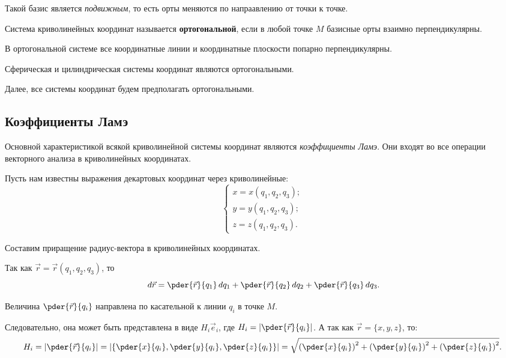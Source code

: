 	Такой базис является \textit{подвижным}, то есть орты меняются по напраавлению от точки к точке.
	
	\begin{definition}
	Система криволинейных координат называется \textbf{ортогональной}, если в любой точке \( M \) базисные орты взаимно перпендикулярны.
	\end{definition}
	
	В ортогональной системе все координатные линии и координатные плоскости попарно перпендикулярны.
	
	Сферическая и цилиндрическая системы координат являются ортогональными.
	
	Далее, все системы координат будем предполагать ортогональными.

\subsection{Коэффициенты Ламэ}

	Основной характеристикой всякой криволинейной системы координат являются \textit{коэффициенты Ламэ}. Они входят во все операции векторного анализа в криволинейных координатах.
	
	Пусть нам известны выражения декартовых координат через криволинейные:
	\[ \left\{ \begin{array}{l}
		x = x(q_1, q_2, q_3); \\
		y = y(q_1, q_2, q_3); \\
		z = z(q_1, q_2, q_3).
	\end{array} \right. \]
	
	Составим приращение радиус-вектора в криволинейных координатах.
	
	Так как \( \vec{r} = \vec{r}(q_1, q_2, q_3) \), то
	\begin{equation}
		\,d\vec{r} = \pder{\vec{r}}{q_1}\,d q_1 + \pder{\vec{r}}{q_2}\,d q_2 + \pder{\vec{r}}{q_3}\,d q_3. \label{eq8:1}
	\end{equation}
	
	Величина \( \pder{\vec{r}}{q_i} \) направлена по касательной к линии \( q_i \) в точке \( M \).
	
	Следовательно, она может быть представлена в виде \( H_i\vec{e}_i \), где \( H_i = \left|\pder{\vec{r}}{q_i}\right| \). А так как \( \vec{r} = \{ x, y, z \} \), то:
	\begin{equation}
		H_i = \left|\pder{\vec{r}}{q_i}\right| = \left|\left\{\pder{x}{q_i}, \pder{y}{q_i}, \pder{z}{q_i}\right\}\right| = \sqrt{\left(\pder{x}{q_i}\right)^2 + \left(\pder{y}{q_i}\right)^2 + \left(\pder{z}{q_i}\right)^2}. \label{eq8:2}
	\end{equation}
	
